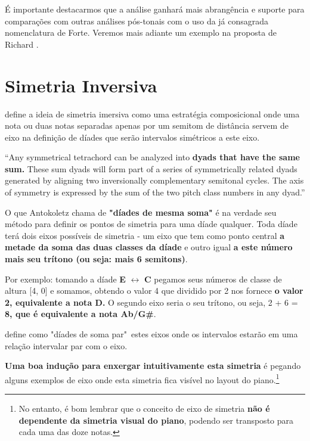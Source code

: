 \documentclass[
	12pt,				%
	openright,			%
	twoside,			%
	a4paper,			%
	english,			%
	french,				%
	spanish,			%
	brazil				%
	]{abntex2}
\begin{document}
É importante destacarmos que a análise ganhará mais abrangência e suporte para comparações com outras análises pós-tonais com o uso da já consagrada nomenclatura de Forte. Veremos mais adiante um exemplo na proposta de Richard . 
 
\section{Simetria Inversiva}

 define a ideia de simetria imersiva como uma estratégia composicional onde uma nota ou duas notas separadas apenas por um semitom de distância servem de eixo na definição de díades que serão intervalos simétricos a este eixo.

\begin{citacao}
“Any symmetrical tetrachord can be analyzed into\textbf{ dyads that have the same sum.} These sum dyads will form part of a series of symmetrically related dyads generated by aligning two inversionally complementary semitonal cycles. The axis of symmetry is expressed by the sum of the two pitch class numbers in any dyad.”
\cite[ p.72]{antokoletz1984music}
\end{citacao}

O que Antokoletz chama de \textbf{"díades de mesma soma"} é na verdade seu método para definir os pontos de simetria para uma díade qualquer. Toda díade terá dois eixos possíveis de simetria - um eixo que tem como ponto central \textbf{a metade da soma das duas classes da díade} e outro igual \textbf{a este número mais seu trítono (ou seja: mais 6 semitons)}. 

Por exemplo: tomando a díade \textbf{E} $\leftrightarrow $ \textbf{C} pegamos seus números de classe de altura [4, 0] e somamos, obtendo o valor 4 que dividido por 2 nos fornece \textbf{o valor 2, equivalente a nota D.} O segundo eixo seria o seu trítono, ou seja, 2 + 6 =\textbf{ 8, que é equivalente a nota Ab/G\#}. 


 define como "díades de soma par"\ estes eixos onde os intervalos estarão em uma relação intervalar par com o eixo.

\textbf{Uma boa indução para enxergar intuitivamente esta simetria} é pegando alguns exemplos de eixo onde esta simetria fica visível no layout do piano.\footnote{No entanto, é bom lembrar que o conceito de eixo de simetria \textbf{não é dependente  da simetria visual do piano}, podendo ser transposto para cada uma das doze notas.}
\end{document}
